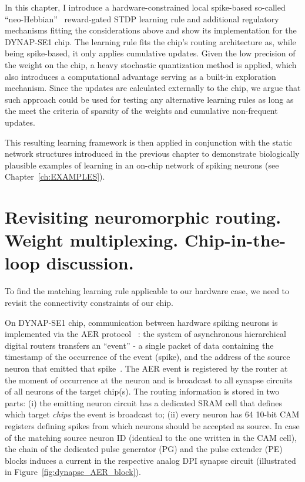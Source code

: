 In this chapter, I introduce a hardware-constrained local spike-based so-called ``neo-Hebbian''~\cite{Gerstner_etal18} reward-gated STDP learning rule and additional regulatory mechanisms fitting the considerations above and show its implementation for the \ac{DYNAP}-SE1 chip. The learning rule fits the chip's routing architecture as, while being spike-based, it only applies cumulative updates. Given the low precision of the weight on the chip, a heavy stochastic quantization method is applied, which also introduces a computational advantage serving as a built-in exploration mechanism. Since the updates are calculated externally to the chip, we argue that such approach could be used for testing any alternative learning rules as long as the meet the criteria of sparsity of the weights and cumulative non-frequent updates.

This resulting learning framework is then applied in conjunction with the static network structures introduced in the previous chapter to demonstrate biologically plausible examples of learning in an on-chip network of spiking neurons (see Chapter~\ref{ch:EXAMPLES}).


\section{Revisiting neuromorphic routing. Weight multiplexing. Chip-in-the-loop discussion.}

To find the matching learning rule applicable to our hardware case, we need to revisit the connectivity constraints of our chip.

On DYNAP-SE1 chip, communication between hardware spiking neurons is implemented via the \ac{AER} protocol ~\cite{Sivilotti91, Deiss_etal94, Boahen00}: the system of asynchronous hierarchical digital routers transfers an ``event'' - a single packet of data containing the timestamp of the occurrence of the event (spike), and the address of the source neuron that emitted that spike~\cite{Moradi_etal18}.
The \ac{AER} event is registered by the router at the moment of occurrence at the neuron and is broadcast to all synapse circuits of all neurons of the target chip(s). The routing information is stored in two parts: (i) the emitting neuron circuit has a dedicated \ac{SRAM} cell that defines which target \emph{chips} the event is broadcast to; (ii) every neuron has 64 10-bit \ac{CAM} registers defining spikes from which neurons should be accepted as source. In case of the matching source neuron ID (identical to the one written in the CAM cell), the chain of the dedicated pulse generator (PG) and the pulse extender (PE) blocks induces a current in the respective analog DPI synapse circuit (illustrated in Figure~\ref{fig:dynapse_AER_block}).

